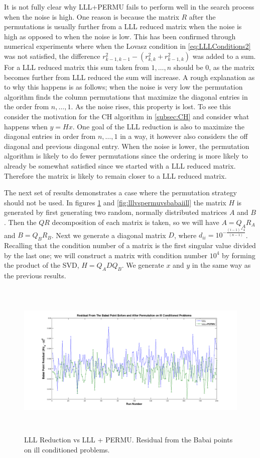\documentclass[12pt,Bold,letterpaper]{mcgilletdclass}
\begin{document}
It is not fully clear why LLL+PERMU fails to perform well in the search process
when the noise is high. One reason is because the matrix $R$ after the
permutations is usually further from a LLL reduced matrix when the noise is high
as opposed to when the noise is low. This has been confirmed through numerical
experiments where when the Lovasz condition in \ref{eq:LLLConditions2} was not
satisfied, the difference $r_{k-1,k-1}^2 - (r_{k,k}^2 + r_{k-1,k}^2)$ was added
to a sum. For a LLL reduced matrix this sum taken from $1 , \dots, n$ should be
$0$, as the matrix becomes further from LLL reduced the sum will increase. A
rough explanation as to why this happens is as follows; when the noise is very
low the permutation algorithm finds the column permutations that maximize the
diagonal entries in the order from $n , \dots, 1$. As the noise rises, this
property is lost. To see this consider the motivation for the CH algorithm in
\ref{subsec:CH} and consider what happens when $y = Hx$. One goal of the LLL
reduction is also to maximize the diagonal entries in order from $n , \dots, 1$
in a way, it however also considers the off diagonal and previous diagonal
entry. When the noise is lower, the permutation algorithm is likely to do fewer
permutations since the ordering is more likely to already be somewhat satisfied
since we started with a LLL reduced matrix. Therefore the matrix is likely to
remain closer to a LLL reduced matrix.

The next set of results demonstrates a case where the permutation strategy should not be used. In figures \ref{fig:lllvspermubabaiill} and \ref{fig:lllvspermuvsbabaiill} the matrix $H$ is generated by first generating two random, normally distributed matrices $A$ and $B$. Then the $QR$ decomposition of each matrix is taken, so we will have $A = Q_AR_A$ and $B = Q_BR_B$. Next we generate a diagonal matrix $D$, where $d_{ii} = 10^{-\frac{(i-1)*4}{(n-1)}}$. Recalling that the condition number of a matrix is the first singular value divided by the last one; we will construct a  matrix with condition number $10^4$ by forming the product of the SVD, $H = Q_ADQ_B$. We generate $x$ and $y$ in the same way as the previous results.

\begin{figure}
\centering
\includegraphics[width=6in,height=3in]{lllvspermubabaiill.png}
\caption{LLL Reduction vs LLL + PERMU. Residual from the Babai points on ill conditioned problems.}
\label{fig:lllvspermubabaiill}
\end{figure}
\end{document}
